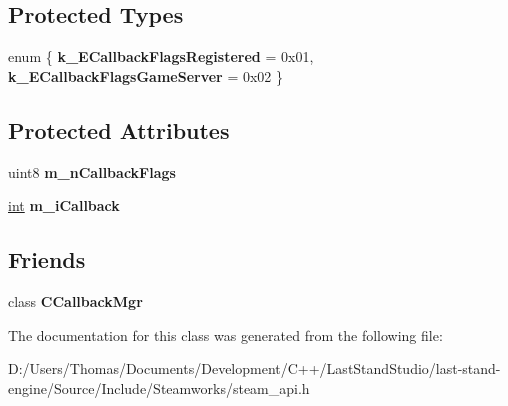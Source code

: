 \subsection*{Protected Types}
\begin{DoxyCompactItemize}
\item 
\hypertarget{classCCallbackBase_a4316a6129595bce2bc598ca6fdefed6d}{}enum \{ {\bfseries k\+\_\+\+E\+Callback\+Flags\+Registered} = 0x01, 
{\bfseries k\+\_\+\+E\+Callback\+Flags\+Game\+Server} = 0x02
 \}\label{classCCallbackBase_a4316a6129595bce2bc598ca6fdefed6d}

\end{DoxyCompactItemize}
\subsection*{Protected Attributes}
\begin{DoxyCompactItemize}
\item 
\hypertarget{classCCallbackBase_a9c16a2ed94511f8f0a6e6ee109d62f79}{}uint8 {\bfseries m\+\_\+n\+Callback\+Flags}\label{classCCallbackBase_a9c16a2ed94511f8f0a6e6ee109d62f79}

\item 
\hypertarget{classCCallbackBase_a1928fd70dabcb4670d5b0cb997a0b5ae}{}\hyperlink{SDL__thread_8h_a6a64f9be4433e4de6e2f2f548cf3c08e}{int} {\bfseries m\+\_\+i\+Callback}\label{classCCallbackBase_a1928fd70dabcb4670d5b0cb997a0b5ae}

\end{DoxyCompactItemize}
\subsection*{Friends}
\begin{DoxyCompactItemize}
\item 
\hypertarget{classCCallbackBase_a20494e55ab44556a1b9d15277289c442}{}class {\bfseries C\+Callback\+Mgr}\label{classCCallbackBase_a20494e55ab44556a1b9d15277289c442}

\end{DoxyCompactItemize}


The documentation for this class was generated from the following file\+:\begin{DoxyCompactItemize}
\item 
D\+:/\+Users/\+Thomas/\+Documents/\+Development/\+C++/\+Last\+Stand\+Studio/last-\/stand-\/engine/\+Source/\+Include/\+Steamworks/steam\+\_\+api.\+h\end{DoxyCompactItemize}
